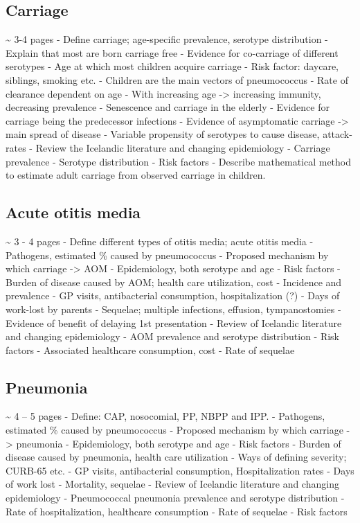\documentclass[]{book}
\theoremstyle{definition}
\theoremstyle{definition}
\theoremstyle{definition}
\theoremstyle{remark}
\begin{document}
\subsection{Carriage}\label{carriage}

\textasciitilde{} 3-4 pages - Define carriage; age-specific prevalence,
serotype distribution - Explain that most are born carriage free -
Evidence for co-carriage of different serotypes - Age at which most
children acquire carriage - Risk factor: daycare, siblings, smoking etc.
- Children are the main vectors of pneumococcus - Rate of clearance
dependent on age - With increasing age -\textgreater{} increasing
immunity, decreasing prevalence - Senescence and carriage in the elderly
- Evidence for carriage being the predecessor infections - Evidence of
asymptomatic carriage -\textgreater{} main spread of disease - Variable
propensity of serotypes to cause disease, attack-rates - Review the
Icelandic literature and changing epidemiology - Carriage prevalence -
Serotype distribution - Risk factors - Describe mathematical method to
estimate adult carriage from observed carriage in children.

\subsection{Acute otitis media}\label{acute-otitis-media}

\textasciitilde{} 3 - 4 pages - Define different types of otitis media;
acute otitis media - Pathogens, estimated \% caused by pneumococcus -
Proposed mechanism by which carriage -\textgreater{} AOM - Epidemiology,
both serotype and age - Risk factors - Burden of disease caused by AOM;
health care utilization, cost - Incidence and prevalence - GP visits,
antibacterial consumption, hospitalization (?) - Days of work-lost by
parents - Sequelae; multiple infections, effusion, tympanostomies -
Evidence of benefit of delaying 1st presentation - Review of Icelandic
literature and changing epidemiology - AOM prevalence and serotype
distribution - Risk factors - Associated healthcare consumption, cost -
Rate of sequelae

\subsection{Pneumonia}\label{pneumonia}

\textasciitilde{} 4 -- 5 pages - Define: CAP, nosocomial, PP, NBPP and
IPP. - Pathogens, estimated \% caused by pneumococcus - Proposed
mechanism by which carriage -\textgreater{} pneumonia - Epidemiology,
both serotype and age - Risk factors - Burden of disease caused by
pneumonia, health care utilization - Ways of defining severity; CURB-65
etc. - GP visits, antibacterial consumption, Hospitalization rates -
Days of work lost - Mortality, sequelae - Review of Icelandic literature
and changing epidemiology - Pneumococcal pneumonia prevalence and
serotype distribution - Rate of hospitalization, healthcare consumption
- Rate of sequelae - Risk factors
\end{document}
